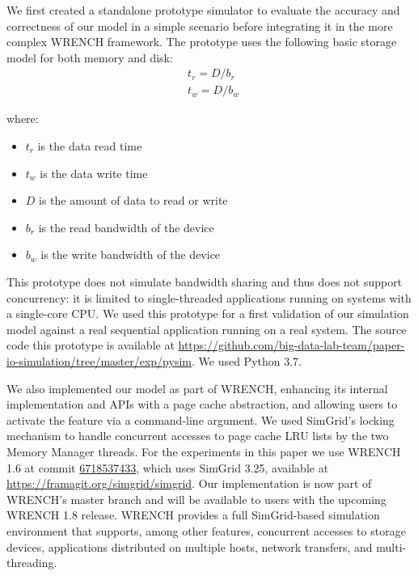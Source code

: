 \documentclass[conference]{IEEEtran}
\newcommand{\simgrid}{SimGrid\xspace}
\newcommand{\wrench}{WRENCH\xspace}
\begin{document}
            We first created a standalone prototype
            simulator to evaluate the accuracy and correctness of our
            model in a simple scenario before integrating it in the more complex
            \wrench framework.
            The prototype uses the following basic storage model for
            both memory and disk:
            \begin{align*}
                & t_{r} = D / b_r \\
                & t_{w} = D / b_w\
            \end{align*}

            where:
            \begin{itemize}
                \item $t_{r}$ is the data read time
                \item $t_{w}$ is the data write time
                \item $D$ is the amount of data to read or write
                \item $b_r$ is the read bandwidth of the device
                \item $b_w$ is the write bandwidth of the device
            \end{itemize}

            This prototype does not simulate  bandwidth sharing and thus does not support
            concurrency: it is limited to single-threaded applications running on systems
            with a single-core CPU. We used this prototype for a first validation of our simulation
            model against a real sequential application running on a real system.
            The source code this prototype is available at
            \url{https://github.com/big-data-lab-team/paper-io-simulation/tree/master/exp/pysim}. We used Python 3.7.

            We also implemented our model as part of \wrench, enhancing its
            internal implementation and APIs with a page cache abstraction,
            and allowing users to activate the feature via a command-line
            argument. We used SimGrid's locking mechanism to handle
            concurrent accesses to page cache LRU lists by the two Memory
            Manager threads. For the experiments in this paper we use
            \wrench 1.6 at commit
            \href{https://github.com/wrench-project/wrench/tree/67185374330d2c4bf274fce222c937e838df5b03}{6718537433},
            which uses \simgrid 3.25, available at
            \url{https://framagit.org/simgrid/simgrid}. Our implementation
            is now part of \wrench's master branch and will be available to
            users with the upcoming \wrench 1.8 release. \wrench provides a full \simgrid-based simulation 
            environment that supports, among other features, concurrent accesses to storage devices, 
            applications distributed on multiple hosts, network transfers, 
            and multi-threading. 
\end{document}
